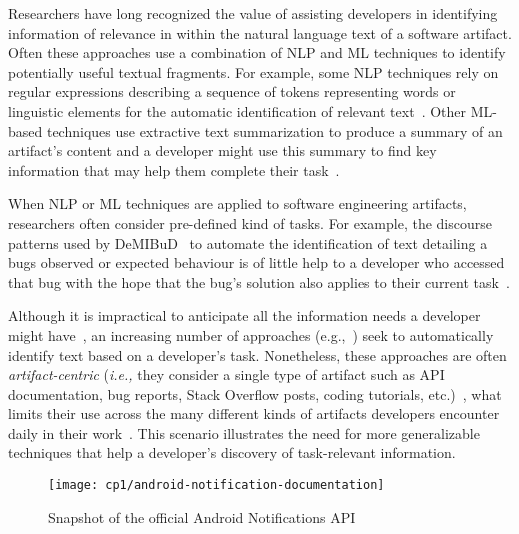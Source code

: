 



Researchers have long recognized the value of assisting developers in 
identifying information of relevance in within the natural language
text of a software artifact. 
Often these approaches use a combination of \acf{NLP} and \acf{ML} techniques to identify potentially useful textual fragments. 
For example, some \acs{NLP} techniques rely on regular expressions describing a sequence of tokens
representing words or linguistic elements for the automatic identification 
of relevant text~\cite{Bavota2016, Chaparro2017}. 
Other \acs{ML}-based techniques use extractive text summarization 
to produce a summary of an artifact's content
and a developer might use this summary to find key information
that may help them complete their task~\cite{Bavota2016}.



When \acs{NLP} or \acs{ML} techniques are applied to software engineering artifacts, researchers often 
consider pre-defined kind of tasks.
For example, the discourse patterns used by {\small DeMIBuD}~\cite{Chaparro2017} 
to automate the identification of text detailing a bugs observed or expected
behaviour is of little help to a developer who accessed that bug 
with the hope that the bug's solution also applies to their current task~\cite{Bavota2016}. 





Although it is impractical to anticipate all the information needs a developer might have~\cite{sillito2006, josyula2018, ko2007}, 
an increasing number of approaches (e.g.,~\cite{Xu2017, silva2019}) seek to automatically
identify text based on a developer's task.
Nonetheless, these approaches are often \textit{artifact-centric} (\textit{i.e.,} they consider a single type of artifact such as API documentation, bug reports, Stack Overflow posts, coding tutorials, etc.)~\cite{nadi2020, Maalej2013, Lotufo2012},
what limits their use across the
many different kinds of artifacts developers encounter
daily in their work~\cite{Li2013}.
This scenario illustrates the need for more generalizable techniques that help a 
developer's discovery of task-relevant information.




\clearpage


\begin{landscape}
\begin{figure}
    \centering
    \texttt{[image: cp1/android-notification-documentation]}
    \caption{Snapshot of the official Android Notifications API}
    \label{fig:android-notifications-api-page}
\end{figure}

\end{landscape}

